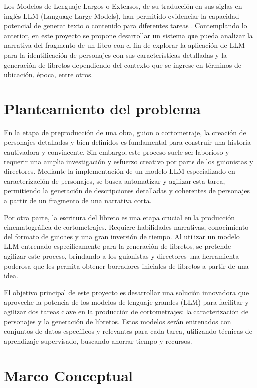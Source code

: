 \documentclass[journal,onecolumn]{IEEEtran}
\begin{document}
	Los Modelos de Lenguaje Largos o Extensos, de su traducción en sus siglas en inglés LLM (Language Large Models), han permitido evidenciar la capacidad potencial de generar texto o contenido para diferentes tareas \cite{reference1}. Contemplando lo anterior, en este proyecto se propone desarrollar un sistema que pueda analizar la narrativa del fragmento de un libro con el fin de explorar la aplicación de LLM\cite{reference2} para la identificación de personajes con sus características detalladas y la generación de libretos dependiendo del contexto que se ingrese en términos de ubicación, época, entre otros.

	
	\section{Planteamiento del problema}
	
	
	En la etapa de preproducción de una obra, guion o cortometraje, la creación de personajes detallados y bien definidos es fundamental para construir una historia cautivadora y convincente. Sin embargo, este proceso suele ser laborioso y requerir una amplia investigación y esfuerzo creativo por parte de los guionistas y directores. Mediante la implementación de un modelo LLM especializado en caracterización de personajes, se busca automatizar y agilizar esta tarea, permitiendo la generación de descripciones detalladas y coherentes de personajes a partir de un fragmento de una narrativa corta.
	
	Por otra parte, la escritura del libreto es una etapa crucial en la producción cinematográfica de cortometrajes. Requiere habilidades narrativas, conocimiento del formato de guiones y una gran inversión de tiempo. Al utilizar un modelo LLM entrenado específicamente para la generación de libretos, se pretende agilizar este proceso, brindando a los guionistas y directores una herramienta poderosa que les permita obtener borradores iniciales de libretos a partir de una idea.
	
	El objetivo principal de este proyecto es desarrollar una solución innovadora que aproveche la potencia de los modelos de lenguaje grandes (LLM) para facilitar y agilizar dos tareas clave en la producción de cortometrajes: la caracterización de personajes y la generación de libretos. Estos modelos serán entrenados con conjuntos de datos específicos y relevantes para cada tarea, utilizando técnicas de aprendizaje supervisado, buscando ahorrar tiempo y recursos.
	\section{Marco Conceptual}
\end{document}
